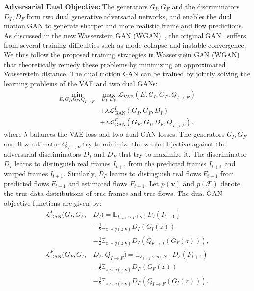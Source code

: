 \documentclass[10pt,twocolumn,letterpaper]{article}
\begin{document}
	\textbf{Adversarial Dual Objective: } The generators $G_I, G_F$ and the discriminators $D_I, D_F$ form two dual generative adversarial networks, and enables the dual motion GAN to generate sharper and more realistic frame and flow predictions. As discussed in the new Wasserstein GAN (WGAN)~\cite{arjovsky2017wasserstein}, the original GAN~\cite{goodfellow2014generative} suffers from several training difficulties such as mode collapse and instable convergence. We thus follow the  proposed training strategies in Wasserstein GAN (WGAN)~\cite{arjovsky2017wasserstein} that theoretically remedy these problems by minimizing an approximated Wasserstein distance. The dual motion GAN can be trained by jointly solving the learning problems of the VAE and two dual GANs:
	\begin{equation}
	\begin{split}
	\min_{E, G_I, G_F, Q_{I\rightarrow F}}&\max_{D_I, D_F} \mathcal{L}_{\text{VAE}}(E, G_I, G_F, Q_{I\rightarrow F})\\ &+\lambda\mathcal{L}_{\text{GAN}}^I(G_I, G_F, D_I)  \\&+ \lambda\mathcal{L}_{\text{GAN}}^F(G_F, G_I, D_F, Q_{I\rightarrow F}). 
	\label{global}
	\end{split}
	\end{equation}
	where $\lambda$ balances the VAE loss and two dual GAN losses. The generators $G_I, G_F$ and flow estimator $Q_{I\rightarrow F}$ try to minimize the whole objective against the adversarial discriminators $D_I$ and $D_F$ that try to maximize it. The discriminator $D_I$ learns to distinguish real frames $I_{t+1}$ from the predicted frames $\ddot{I}_{t+1}$ and warped frames $\bar{I}_{t+1}$. Similarly, $D_F$ learns to distinguish real flows $F_{t+1}$ from predicted flows $\bar{F}_{t+1}$ and estimated flows $\ddot{F}_{t+1}$. Let $p(\mathbf{v})$ and $p(\mathcal{F})$ denote the true data distributions of true frames and true flows. The dual GAN objective functions are given by:
	\begin{equation}
	\begin{split}
	\mathcal{L}_{\text{GAN}}^I(G_I, G_F, &D_I) = \mathbb{E}_{I_{t+1} \sim p(\mathbf{v})} D_I(I_{t+1})\\& - \frac{1}{2}\mathbb{E}_{z \sim q(z|\mathbf{v})} D_I(G_I(z)) \\&- \frac{1}{2}\mathbb{E}_{z \sim q(z|\mathbf{v})} D_I(Q_{F\rightarrow I}(G_F(z))),\\
	\mathcal{L}_{\text{GAN}}^F(G_F, G_I, &D_F, Q_{I\rightarrow F}) = \mathbb{E}_{F_{t+1} \sim p(\mathcal{F})} D_F(F_{t+1})\\& - \frac{1}{2}\mathbb{E}_{z \sim q(z|\mathbf{v})} D_F(G_F(z))\\& - \frac{1}{2}\mathbb{E}_{z \sim q(z|\mathbf{v})} D_F(Q_{I\rightarrow F}(G_I(z))).
	\end{split}
	\end{equation}
\end{document}
